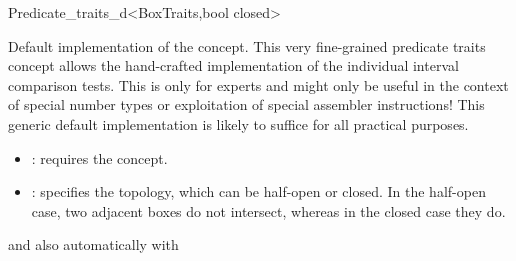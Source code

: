 
\ccRefPageBegin
\begin{ccRefClass}{Predicate_traits_d<BoxTraits,bool closed>}
\begin{ccAdvanced}

\ccDefinition

Default implementation of the 
concept. This very fine-grained predicate traits concept allows the
hand-crafted implementation of the individual interval comparison
tests. This is only for experts and might only be useful in the
context of special number types or exploitation of special assembler
instructions!  This generic default implementation is likely to
suffice for all practical purposes.

\begin{itemize}
  \item
    : requires the  concept.
  \item
    : specifies the topology, which can be half-open
    or closed. In the half-open case, two adjacent boxes do not
    intersect, whereas in the closed case they do.
\end{itemize}

and also automatically with\\

\ccIsModel


\ccCreation
{}


\ccSeeAlso

\\


\end{ccAdvanced}
\end{ccRefClass}

